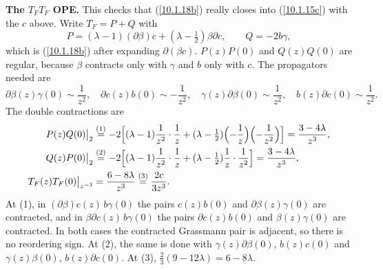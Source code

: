 \begin{tcolorbox}[breakable]
\begin{remark}
		\textbf{The $T_FT_F$ OPE.} This checks that (\ref{10.1.18b}) really closes into (\ref{10.1.15c}) with the $c$ above. Write $T_F=P+Q$ with
		\begin{equation*}
			P=(\lambda-1)(\partial\beta)c+(\lambda-\tfrac12)\beta\partial c,\qquad Q=-2b\gamma,
		\end{equation*}
		which is (\ref{10.1.18b}) after expanding $\partial(\beta c)$. $P(z)P(0)$ and $Q(z)Q(0)$ are regular, because $\beta$ contracts only with $\gamma$ and $b$ only with $c$. The propagators needed are
		\begin{equation*}
			\partial\beta(z)\gamma(0)\sim\frac{1}{z^{2}},\quad \partial c(z)b(0)\sim-\frac{1}{z^{2}},\quad \gamma(z)\partial\beta(0)\sim\frac{1}{z^{2}},\quad b(z)\partial c(0)\sim\frac{1}{z^{2}} .
		\end{equation*}
		The double contractions are
		\begin{align*}
			P(z)Q(0)\big|_{2}&\overset{(1)}{=}-2\Bigl[(\lambda-1)\frac{1}{z^{2}}\cdot\frac{1}{z}+(\lambda-\tfrac12)\Bigl(-\frac1z\Bigr)\Bigl(-\frac{1}{z^{2}}\Bigr)\Bigr]=\frac{3-4\lambda}{z^{3}},\\
			Q(z)P(0)\big|_{2}&\overset{(2)}{=}-2\Bigl[(\lambda-1)\frac{1}{z^{2}}\cdot\frac{1}{z}+(\lambda-\tfrac12)\frac{1}{z}\cdot\frac{1}{z^{2}}\Bigr]=\frac{3-4\lambda}{z^{3}},\\
			T_F(z)T_F(0)\big|_{z^{-3}}&=\frac{6-8\lambda}{z^{3}}\overset{(3)}{=}\frac{2c}{3z^{3}} .
		\end{align*}
		At (1), in $(\partial\beta)c(z)\,b\gamma(0)$ the pairs $c(z)b(0)$ and $\partial\beta(z)\gamma(0)$ are contracted, and in $\beta\partial c(z)\,b\gamma(0)$ the pairs $\partial c(z)b(0)$ and $\beta(z)\gamma(0)$ are contracted. In both cases the contracted Grassmann pair is adjacent, so there is no reordering sign. At (2), the same is done with $\gamma(z)\partial\beta(0)$, $b(z)c(0)$ and $\gamma(z)\beta(0)$, $b(z)\partial c(0)$. At (3), $\tfrac23(9-12\lambda)=6-8\lambda$.


\end{remark}
\end{tcolorbox}
